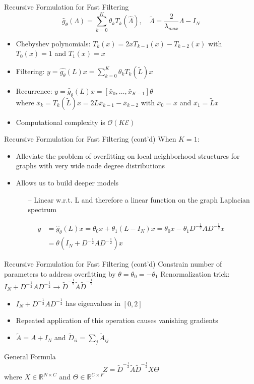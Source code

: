 \documentclass{beamer}
\begin{document}
\begin{frame}{Recursive Formulation for Fast Filtering}
  \[
  \hat{g}_\theta(\Lambda) = \sum_{k=0}^{K}{\theta_kT_k(\hat\Lambda)}, \quad \tilde{\Lambda}=\frac{2}{\lambda_{max}}\Lambda - I_N
  \]
  \begin{itemize}
  \item Chebyshev polynomials: $T_k(x) = 2xT_{k-1}(x)-T_{k-2}(x)$ with $T_0(x)=1$ and $T_1(x)=x$
  \item Filtering: $y=\hat{g_\theta}(L)x=\sum_{k=0}^{K}{\theta_kT_k(\tilde{L})x}$
  \item Recurrence:
    $y=\hat{g}_\theta(L)x=[\bar{x}_0,\dots,\bar{x}_{K-1}]\theta$\\ where
    $\bar{x}_k=T_k(\tilde{L})x=2L\bar{x}_{k-1}-\bar{x}_{k-2}$ with
    $\bar{x}_0=x$ and $\bar{x_1}=\tilde{L}x$
    \item Computational complexity is $\mathcal{O}(K\mathcal{E})$
  \end{itemize}
\end{frame}
\begin{frame}{Recursive Formulation for Fast Filtering (cont'd)}
  When $K=1$:
  \begin{itemize}
  \item Alleviate the problem of overfitting on local neighborhood
    structures for graphs with very wide node degree distributions
  \item Allows us to build deeper models
    \begin{itemize}
    \item[--] Linear w.r.t. L and therefore a linear function on the
      graph Laplacian spectrum
    \end{itemize}
  \end{itemize}
  \begin{align*}
    y &= \hat{g}_\theta(L)x=\theta_0x+\theta_1(L-I_N)x=\theta_0x-\theta_1D^{-\frac{1}{2}}AD^{-\frac{1}{2}}x \\
    &= \theta\left(I_N+D^{-\frac{1}{2}}AD^{-\frac{1}{2}}\right)x
  \end{align*}
\end{frame}
\begin{frame}{Recursive Formulation for Fast Filtering (cont'd)}
  Constrain number of parameters to address overfitting by
  $\theta=\theta_0=-\theta_1$
  Renormalization trick: $I_N+D^{-\frac{1}{2}}AD^{-\frac{1}{2}} \rightarrow \tilde{D}^{-\frac{1}{2}}\tilde{A}\tilde{D}^{-\frac{1}{2}}$
  \begin{itemize}
  \item $I_N+D^{-\frac{1}{2}}AD^{-\frac{1}{2}}$ has eigenvalues in $[0,2]$
  \item Repeated application of this operation causes vanishing gradients
  \item $\tilde{A}=A+I_N$ and $\tilde{D}_{ii}=\sum_{j}^{}{\tilde{A}_{ij}}$
  \end{itemize}
  \begin{block}{General Formula}
    \[
    Z=\tilde{D}^{-\frac{1}{2}}\tilde{A}\tilde{D}^{-\frac{1}{2}}X\Theta
    \]
    where $X \in \mathbb{R}^{N \times C}$ and $\Theta \in \mathbb{R}^{C \times F}$
  \end{block}
\end{frame}
\end{document}
